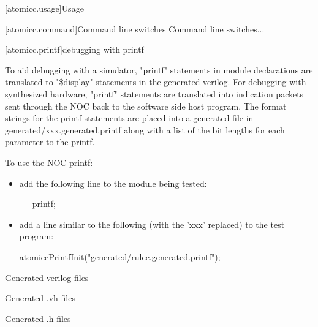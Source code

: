 [atomicc.usage]{Usage}

[atomicc.command]{Command line switches}
Command line switches...

[atomicc.printf]{debugging with printf}

To aid debugging with a simulator, "printf" statements in module declarations are
translated to "\$display" statements in the generated verilog.
For debugging with synthesized hardware, "printf" statements are translated into
indication packets sent through the NOC back to the software side host program.
The format strings for the printf statements are placed into a generated file
in generated/xxx.generated.printf along with a list of the bit lengths for each
parameter to the printf.

\begin{bnf}
\br
\end{bnf}

To use the NOC printf:
\begin{itemize}
\item add the following line to the module being tested:
\begin{codeblock}
     __printf;
\end{codeblock}
\item add a line similar to the following (with the 'xxx' replaced) to the test program:
\begin{codeblock}
     atomiccPrintfInit("generated/rulec.generated.printf");
\end{codeblock}
\end{itemize}


Generated verilog files

Generated .vh files

Generated .h files

